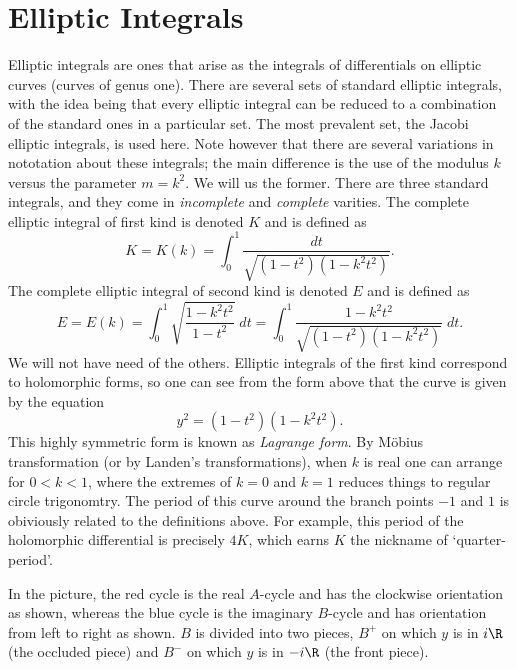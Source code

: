 \documentclass{article}
\begin{document}
\section{Elliptic Integrals}
Elliptic integrals are ones that arise as the integrals of differentials on elliptic curves (curves of genus one). There are several sets of standard elliptic integrals, with the idea being that every elliptic integral can be reduced to a combination of the standard ones in a particular set. The most prevalent set, the Jacobi elliptic integrals, is used here. Note however that there are several variations in nototation about these integrals; the main difference is the use of the modulus $k$ versus the parameter $m = k^2$. We will us the former. There are three standard integrals, and they come in {\it incomplete} and {\it complete} varities. The complete elliptic integral of first kind is denoted $K$ and is defined as
\[
K = K(k) = \int_0^1 \frac{dt}{\sqrt{(1-t^2)(1-k^2 t^2)}} .
\]
The complete elliptic integral of second kind is denoted $E$ and is defined as
\[
E = E(k) = \int_0^1 \sqrt{\frac{1-k^2 t^2}{1-t^2}} \;dt = \int_0^1 \frac{1-k^2 t^2}{\sqrt{(1-t^2)(1-k^2 t^2)}}\;dt .
\]
We will not have need of the others. Elliptic integrals of the first kind correspond to holomorphic forms, so one can see from the form above that the curve is given by the equation
\[
y^2 = (1-t^2)(1-k^2 t^2).
\]
This highly symmetric form is known as {\it Lagrange form}. By M\"obius transformation (or by Landen's transformations), when $k$ is real one can arrange for $0< k < 1$, where the extremes of $k=0$ and $k=1$ reduces things to regular circle trigonomtry. The period of this curve around the branch points $-1$ and $1$ is obiviously related to the definitions above. For example, this period of the holomorphic differential is precisely $4K$, which earns $K$ the nickname of `quarter-period'.

\begin{center}

\end{center}

In the picture, the red cycle is the real $A$-cycle and has the clockwise orientation as shown, whereas the blue cycle is the imaginary $B$-cycle and has orientation from left to right as shown. $B$ is divided into two pieces, $B^+$ on which $y$ is in $i\R$ (the occluded piece) and $B^-$ on which $y$ is in $-i\R$ (the front piece).
\end{document}
